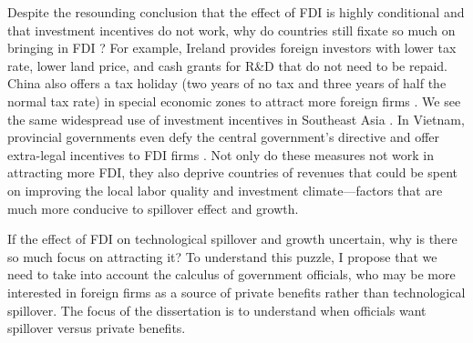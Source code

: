 Despite the resounding conclusion that the effect of FDI is highly conditional and that investment incentives do not work, why do countries still fixate so much on bringing in FDI \citep{Blomstrom2002}? For example, Ireland provides foreign investors with lower tax rate, lower land price, and cash grants for R\&D that do not need to be repaid. China also offers a tax holiday (two years of no tax and three years of half the normal tax rate) in special economic zones to attract more foreign firms \citep{Telford2001}. We see the same widespread use of investment incentives in Southeast Asia \citep{Fletcher2002}. In Vietnam, provincial governments even defy the central government's directive and offer extra-legal incentives to FDI firms \citep{Vu2007}. Not only do these measures not work in attracting more FDI, they also deprive countries of revenues that could be spent on improving the local labor quality and investment climate---factors that are much more conducive to spillover effect and growth.

If the effect of FDI on technological spillover and growth uncertain, why is there so much focus on attracting it? To understand this puzzle, I propose that we need to take into account the calculus of government officials, who may be more interested in foreign firms as a source of private benefits rather than technological spillover. The focus of the dissertation is to understand when officials want spillover versus private benefits.
